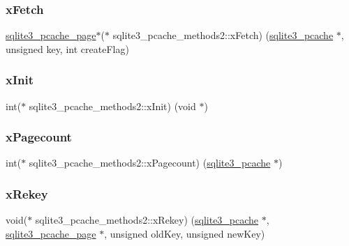 \mbox{\label{structsqlite3__pcache__methods2_a6283d91a6ad5037fad33003c2198c9f7}} 
\subsubsection{\texorpdfstring{xFetch}{xFetch}}
{\footnotesize\ttfamily \mbox{\hyperlink{structsqlite3__pcache__page}{sqlite3\+\_\+pcache\+\_\+page}}$\ast$($\ast$ sqlite3\+\_\+pcache\+\_\+methods2\+::x\+Fetch) (\mbox{\hyperlink{sqlite3_8h_a096c453d937d51f7926d7d31c8e0bd2f}{sqlite3\+\_\+pcache}} $\ast$, unsigned key, int create\+Flag)}

\mbox{\label{structsqlite3__pcache__methods2_a21f7fdd82d029d3b0567c573c012adfc}} 
\subsubsection{\texorpdfstring{xInit}{xInit}}
{\footnotesize\ttfamily int($\ast$ sqlite3\+\_\+pcache\+\_\+methods2\+::x\+Init) (void $\ast$)}

\mbox{\label{structsqlite3__pcache__methods2_a16b85f7889b050702c739eccf2f0c036}} 
\subsubsection{\texorpdfstring{xPagecount}{xPagecount}}
{\footnotesize\ttfamily int($\ast$ sqlite3\+\_\+pcache\+\_\+methods2\+::x\+Pagecount) (\mbox{\hyperlink{sqlite3_8h_a096c453d937d51f7926d7d31c8e0bd2f}{sqlite3\+\_\+pcache}} $\ast$)}

\mbox{\label{structsqlite3__pcache__methods2_ad5b7609bdc0d2ae80325f7925b76c0af}} 
\subsubsection{\texorpdfstring{xRekey}{xRekey}}
{\footnotesize\ttfamily void($\ast$ sqlite3\+\_\+pcache\+\_\+methods2\+::x\+Rekey) (\mbox{\hyperlink{sqlite3_8h_a096c453d937d51f7926d7d31c8e0bd2f}{sqlite3\+\_\+pcache}} $\ast$, \mbox{\hyperlink{structsqlite3__pcache__page}{sqlite3\+\_\+pcache\+\_\+page}} $\ast$, unsigned old\+Key, unsigned new\+Key)}

